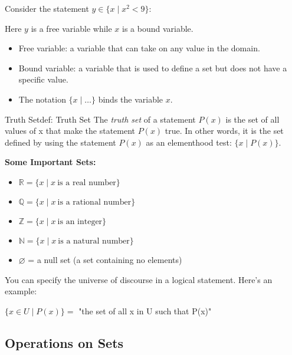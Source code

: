 \documentclass[11pt]{article}
\begin{document}
Consider the statement \( y \in \{ x \mid x^2 < 9 \} \):

\begin{center}
    Here \( y \) is a free variable while \( x \) is a bound variable.
    \begin{itemize}
        \item Free variable: a variable that can take on any value in the domain.
        \item Bound variable: a variable that is used to define a set but does not have a specific value.
        \item The notation \( \{ x \mid \ldots \} \) binds the variable \( x \).
    \end{itemize}
\end{center}

\begin{definition}{Truth Set}{def: Truth Set}
The \textit{truth set} of a statement $P(x)$ is the set of all values of x that make the statement $P(x)$ true. In other words, it is the set defined by using the statement $P(x)$ as an elementhood test: $\{x \mid P(x) \}$.
\end{definition}

\pagebreak

\textbf{Some Important Sets:}
\begin{itemize}
    \item $\mathds{R} = \{x \mid x\ \text{is a real number}\}$
    \item $\mathds{Q} = \{x \mid x\ \text{is a rational number}\}$
    \item $\mathds{Z} = \{x \mid x\ \text{is an integer}\}$
    \item $\mathds{N} = \{x \mid x\ \text{is a natural number}\}$
    \item $\varnothing$ = a null set (a set containing no elements)
\end{itemize}

You can specify the universe of discourse in a logical statement. Here's an example:
\begin{center}
    $\{x \in U \mid P(x) \} = $ "the set of all x in U such that P(x)"
\end{center}

\subsection{Operations on Sets}
\end{document}
